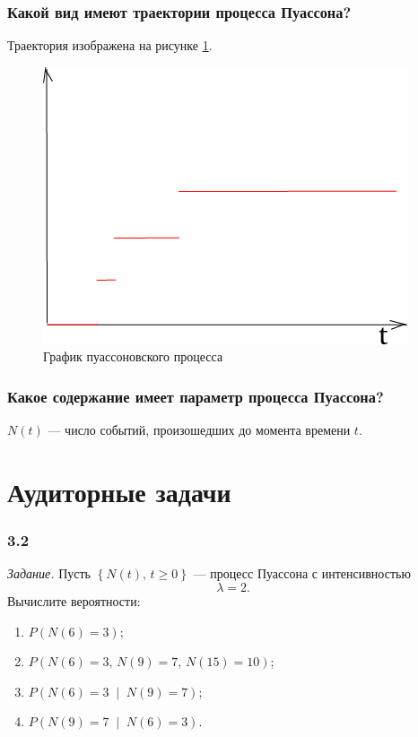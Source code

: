 \subsubsection*{Какой вид имеют траектории процесса Пуассона?}

Траектория изображена на рисунке \ref{fig:3}.

\begin{figure}[h!]
  \centering
  \includegraphics[width=.4\textwidth]{./pictures/3.png}
  \caption{График пуассоновского процесса}
  \label{fig:3}
\end{figure}

\subsubsection*{Какое содержание имеет параметр процесса Пуассона?}

$N \left( t \right) $ --- число событий, произошедших до момента времени $t$.

\section*{Аудиторные задачи}

\subsubsection*{3.2}

\textit{Задание.}
Пусть $ \left\{ N \left( t \right), \, t \geq 0 \right\} $ ---
процесс Пуассона с интенсивностью
$$ \lambda = 2.$$
Вычислите вероятности:
\begin{enumerate}[label=\alph*)]
  \item $P \left( N \left( 6 \right) = 3 \right) $;
  \item $P \left(
    N \left( 6 \right) = 3, \, N \left(9 \right) = 7, \, N \left( 15 \right) = 10 \right) $;
  \item $P \left( N \left( 6 \right) = 3 \; \middle| \; N \left( 9 \right) = 7 \right) $;
  \item $P \left( N \left( 9 \right) = 7 \; \middle| \; N \left( 6 \right) = 3 \right) $.
\end{enumerate}

